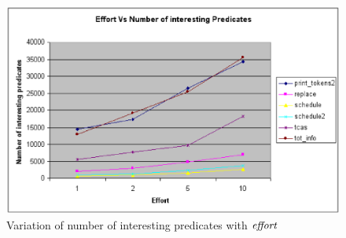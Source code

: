 \begin{figure}
  \centering
  \includegraphics[width=\columnwidth]{charts/effort}
  \caption{Variation of number of interesting predicates with $\mathit{effort}$}
  \label{fig-effort}
\end{figure}

